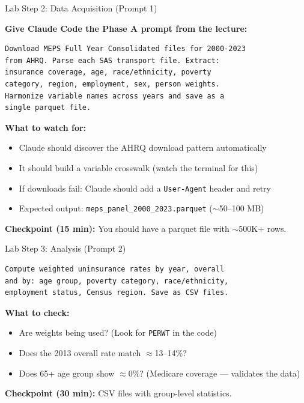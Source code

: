 \documentclass[10pt,english,aspectratio=169]{beamer}
\begin{document}
\begin{frame}[fragile]{Lab Step 2: Data Acquisition (Prompt 1)}

\textbf{Give Claude Code the Phase A prompt from the lecture:}

\begin{lstlisting}[style=pythonstyle, language={}, basicstyle=\ttfamily\scriptsize]
Download MEPS Full Year Consolidated files for 2000-2023
from AHRQ. Parse each SAS transport file. Extract:
insurance coverage, age, race/ethnicity, poverty
category, region, employment, sex, person weights.
Harmonize variable names across years and save as a
single parquet file.
\end{lstlisting}

\vspace{0.3cm}
\textbf{What to watch for:}
\begin{itemize}
    \item Claude should discover the AHRQ download pattern automatically
    \item It should build a variable crosswalk (watch the terminal for this)
    \item If downloads fail: Claude should add a \texttt{User-Agent} header and retry
    \item Expected output: \texttt{meps\_panel\_2000\_2023.parquet} ($\sim$50--100 MB)
\end{itemize}

\vspace{0.2cm}
\textbf{Checkpoint (15 min):} You should have a parquet file with $\sim$500K+ rows.

\end{frame}

\begin{frame}[fragile]{Lab Step 3: Analysis (Prompt 2)}

\begin{lstlisting}[style=pythonstyle, language={}, basicstyle=\ttfamily\scriptsize]
Compute weighted uninsurance rates by year, overall
and by: age group, poverty category, race/ethnicity,
employment status, Census region. Save as CSV files.
\end{lstlisting}

\vspace{0.3cm}
\textbf{What to check:}
\begin{itemize}
    \item Are weights being used? (Look for \texttt{PERWT} in the code)
    \item Does the 2013 overall rate match $\approx$13--14\%?
    \item Does 65+ age group show $\approx$0\%? (Medicare coverage --- validates the data)
\end{itemize}

\vspace{0.3cm}
\textbf{Checkpoint (30 min):} CSV files with group-level statistics.

\end{frame}
\end{document}
